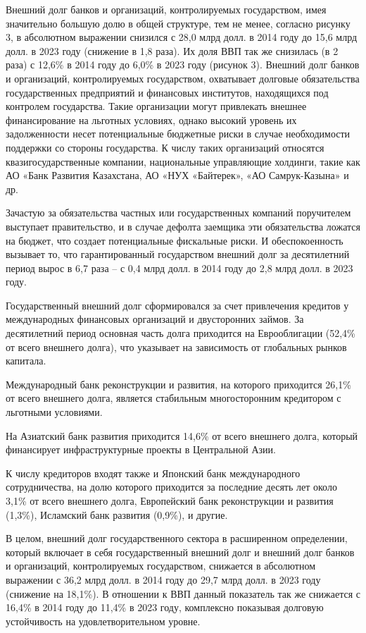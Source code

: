 \begin{multicols}{2}
Внешний долг банков и организаций, контролируемых государством, имея
значительно большую долю в общей структуре, тем не менее, согласно
рисунку 3, в абсолютном выражении снизился с 28,0 млрд долл. в 2014 году
до 15,6 млрд долл. в 2023 году (снижение в 1,8 раза). Их доля ВВП так же
снизилась (в 2 раза) с 12,6\% в 2014 году до 6,0\% в 2023 году (рисунок
3). Внешний долг банков и организаций, контролируемых государством,
охватывает долговые обязательства государственных предприятий и
финансовых институтов, находящихся под контролем государства. Такие
организации могут привлекать внешнее финансирование на льготных
условиях, однако высокий уровень их задолженности несет потенциальные
бюджетные риски в случае необходимости поддержки со стороны государства.
К числу таких организаций относятся квазигосударственные компании,
национальные управляющие холдинги, такие как АО «Банк Развития
Казахстана, АО «НУХ «Байтерек», «АО Самрук-Казына» и др.

Зачастую за обязательства частных или государственных компаний
поручителем выступает правительство, и в случае дефолта заемщика эти
обязательства ложатся на бюджет, что создает потенциальные фискальные
риски. И обеспокоенность вызывает то, что гарантированный государством
внешний долг за десятилетний период вырос в 6,7 раза -- с 0,4 млрд долл.
в 2014 году до 2,8 млрд долл. в 2023 году.

Государственный внешний долг сформировался за счет привлечения кредитов
у международных финансовых организаций и двусторонних займов. За
десятилетний период основная часть долга приходится на Еврооблигации
(52,4\% от всего внешнего долга), что указывает на зависимость от
глобальных рынков капитала.

Международный банк реконструкции и развития, на которого приходится
26,1\% от всего внешнего долга, является стабильным многосторонним
кредитором с льготными условиями.

На Азиатский банк развития приходится 14,6\% от всего внешнего долга,
который финансирует инфраструктурные проекты в Центральной Азии.

К числу кредиторов входят также и Японский банк международного
сотрудничества, на долю которого приходится за последние десять лет
около 3,1\% от всего внешнего долга, Европейский банк реконструкции и
развития (1,3\%), Исламский банк развития (0,9\%), и другие.

В целом, внешний долг государственного сектора в расширенном
определении, который включает в себя государственный внешний долг и
внешний долг банков и организаций, контролируемых государством,
снижается в абсолютном выражении с 36,2 млрд долл. в 2014 году до 29,7
млрд долл. в 2023 году (снижение на 18,1\%). В отношении к ВВП данный
показатель так же снижается с 16,4\% в 2014 году до 11,4\% в 2023 году,
комплексно показывая долговую устойчивость на удовлетворительном уровне.


\end{multicols}
